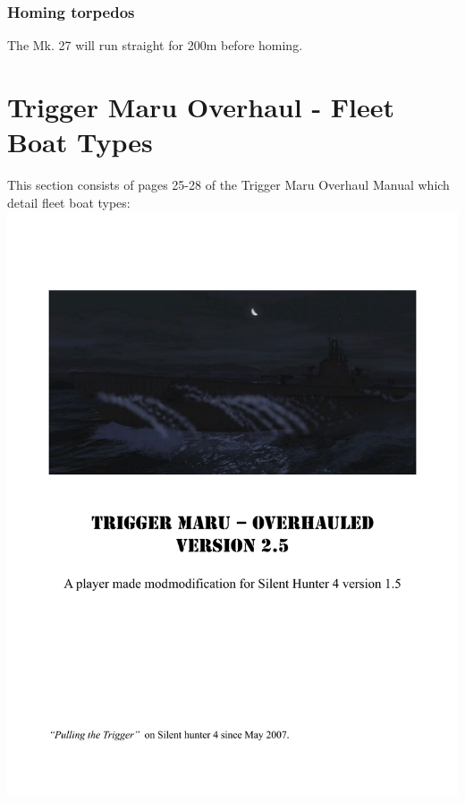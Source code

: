 \documentclass{article}
\begin{document}
\subsubsection{Homing torpedos}
The Mk. 27 will run straight for 200m before homing.

\section{Trigger Maru Overhaul - Fleet Boat Types}
This section consists of pages 25-28 of the Trigger Maru Overhaul Manual which detail fleet boat types:
\includegraphics[page={25}, width=\textwidth, height=\textheight]{TMO_Manual}
\end{document}
